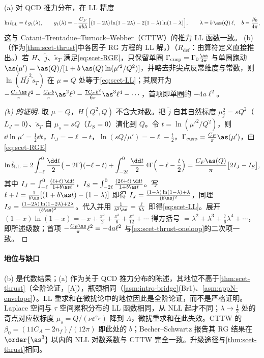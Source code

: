 \begin{proposition}\label{prop:scet-ll}
(a) 对 QCD 推力分布，在 LL 精度
\begin{equation}\label{eq:scet-LL}
\ln\tilde t_{\rm LL}=\ell\,g_1(\lambda),\qquad g_1(\lambda)=-\frac{C_F}{\pi b\lambda}\Big[(1-2\lambda)\ln(1-2\lambda)-2(1-\lambda)\ln(1-\lambda)\Big],\qquad \lambda=b\,\as(Q)\,\ell,\quad b=\frac{\beta_0}{4\pi},
\end{equation}
这与 Catani--Trentadue--Turnock--Webber（CTTW）的推力 LL 函数一致\cite{CataniEtAl1993}。
(b)（作为\cref{thm:scet-thrust}中各因子 RG 方程的 LL 解，\tagR）（$R_{\mathrm{def}}$：由算符定义直接推出。）若 $H$、$\tilde j$、$\tilde s_T$ 满足\cref{eq:scet-RGE}，只保留单圈 $\Gamma_{\rm cusp}=\Gamma_0\frac{\as}{4\pi}$ 与单圈跑动 $\as(\mu')=\as(Q)/[1+b\,\as(Q)\ln(\mu'^2/Q^2)]$，并略去非尖点反常维度与常数，则 $\ln(H\tilde j^2\tilde s_T)$ 在 $\mu=Q$ 处等于\cref{eq:scet-LL}；其展开为 $-\frac{C_F\as}{\pi}\ell^2-\frac{C_Fb}{\pi}\as^2\ell^3-\frac{7C_Fb^2}{6\pi}\as^3\ell^4-\cdots$，首项即单圈的 $-4a\ell^2$。
\end{proposition}

\begin{proof}[(b) 的证明]
取 $\mu=Q$，$H(Q^2,Q)$ 不含大对数。把 $\tilde j$ 自其自然标度 $\mu_j^2=sQ^2$（$L_J=0$）、$\tilde s_T$ 自 $\mu_s=sQ$（$L_S=0$）演化到 $Q$。令 $t=\ln(\mu'^2/Q^2)$，则 $\dd\ln\mu'=\frac12\dd t$，$L_J=-\ell-t$，$\ln(sQ/\mu')=-\ell-\frac t2$，$\Gamma_{\rm cusp}=\frac{C_F}{\pi}\as(\mu')$，由\cref{eq:scet-RGE}
\[
\ln\tilde t_{\rm LL}=2\int_{-\ell}^{0}\frac{\dd t}{2}\big(-2\Gamma\big)(-\ell-t)+\int_{-2\ell}^{0}\frac{\dd t}{2}\,4\Gamma\Big(-\ell-\frac t2\Big)=\frac{C_F\as(Q)}{\pi}\big[2I_J-I_S\big],
\]
其中 $I_J=\int_{-\ell}^0\frac{(\ell+t)\,\dd t}{1+b\as t}$，$I_S=\int_{-2\ell}^0\frac{(2\ell+t)\,\dd t}{1+b\as t}$。写 $\ell+t=\frac{1}{b\as}[(1+b\as t)-(1-\lambda)]$ 即得 $I_J=\frac{(1-\lambda)\ln(1-\lambda)+\lambda}{(b\as)^2}$，同理 $I_S=\frac{(1-2\lambda)\ln(1-2\lambda)+2\lambda}{(b\as)^2}$。代入并用 $\frac1{b^2\as}=\frac{\ell}{b\lambda}$ 即得\cref{eq:scet-LL}。展开 $(1-x)\ln(1-x)=-x+\frac{x^2}2+\frac{x^3}6+\frac{x^4}{12}+\cdots$ 得方括号 $=\lambda^2+\lambda^3+\frac76\lambda^4+\cdots$，即所述级数；首项 $-\frac{C_F\as}\pi\ell^2=-4a\ell^2$ 与\cref{ex:scet-thrust-oneloop}的二次项一致。%
\end{proof}

\paragraph{地位与缺口}
(b) 是代数结果；(a) 作为关于 QCD 推力分布的陈述，其地位不高于\cref{thm:scet-thrust}（全阶论证，[A]），瓶颈相同（\cref{asm:intro-bridge}(Br1)、\cref{asm:appN-envelope}）。LL 重求和在微扰论中的地位因此是全阶论证，而不是严格证明。Laplace 空间与 $\tau$ 空间累积分布的 LL 函数相同，从 NLL 起才不同；$\lambda\to\frac12$ 处的奇点对应软标度 $\mu_s=Q/(\nu\ee^{\gamma_E})$ 降到 $\Lambda$，微扰重求和在此失效。CTTW 的 $\beta_0=(11C_A-2n_f)/(12\pi)$ 即此处的 $b$；Becher--Schwartz 报告其 RG 结果在 $\order{\as^3}$ 以内的 NLL 对数系数与 CTTW 完全一致\cite{BecherSchwartz2008}。升级途径与\cref{thm:scet-thrust}相同。

